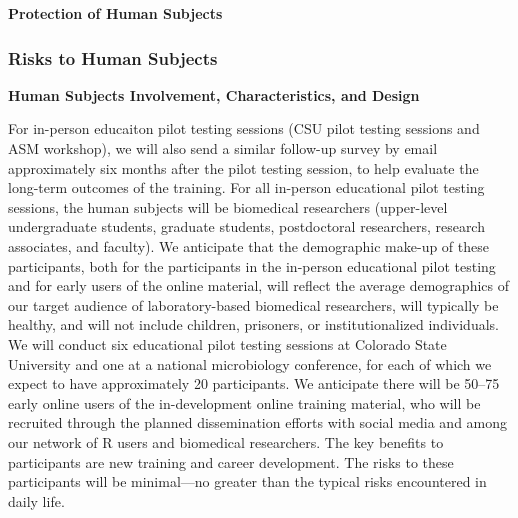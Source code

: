 \documentclass[pdftex,english,11.5pt,parskip=half]{scrartcl}
\begin{document}
\def\bf{\normalfont\bfseries}
\pagestyle{empty}

{\large \textbf{Protection of Human Subjects}}

\subsubsection*{Risks to Human Subjects}

\textbf{Human Subjects Involvement, Characteristics, and Design}

For in-person educaiton pilot testing sessions  (CSU pilot testing sessions and ASM workshop), we will also send a similar follow-up survey by email approximately six months after the pilot testing session, to help evaluate the long-term outcomes of the training. For all in-person educational pilot testing sessions, the human subjects will be biomedical researchers (upper-level undergraduate students, graduate students, postdoctoral researchers, research associates, and faculty). We anticipate that the demographic make-up of these participants, both for the participants in the in-person educational pilot testing and for early users of the online material, will reflect the average demographics of our target audience of laboratory-based biomedical researchers, will typically be healthy, and will not include children, prisoners, or institutionalized individuals. We will conduct six educational pilot testing sessions at Colorado State University and one at a national microbiology conference, for each of which we expect to have approximately 20 participants. We anticipate there will be 50--75 early online users of the in-development online training material, who will be recruited through the planned dissemination efforts with social media and among our network of R users and biomedical researchers. The key benefits to participants are new training and career development. The risks to these participants will be minimal---no greater than the typical risks encountered in daily life.
\end{document}
